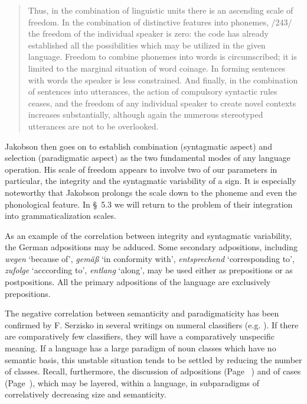 \begin{quote}
Thus, in the combination of linguistic units there is an ascending scale of freedom. In the combination of distinctive features into phonemes, /243/ the freedom of the individual speaker is zero: the code has already established all the possibilities which may be utilized in the given language. Freedom to combine phonemes into words is circumscribed; it is limited to the marginal situation of word coinage. In forming sentences with words the speaker is less constrained. And finally, in the combination of sentences into utterances, the action of compulsory syntactic rules ceases, and the freedom of any individual speaker to create novel contexts increases substantially, although again the numerous stereotyped utterances are not to be overlooked.
\end{quote}

\noindent Jakobson then goes on to establish combination (syntagmatic aspect) and selection (paradigmatic aspect) as the two fundamental modes of any language operation. His scale of freedom appears to involve two of our parameters in particular, the integrity and the syntagmatic variability of a sign. It is especially noteworthy that Jakobson prolongs the scale down to the phoneme and even the phonological feature. In §~5.3 we will return to the problem of their integration into grammaticalization scales.

As an example of the correlation between integrity and syntagmatic variability, the German adpositions may be adduced. Some secondary adpositions, including \textit{wegen} ‘because of’, \textit{gemäß} ‘in conformity with’, \textit{entsprechend} ‘corresponding to’, \textit{zufolge} ‘acccording to’, \textit{entlang} ‘along’, may be used either as prepositions or as postpositions. All the primary adpositions of the language are exclusively prepositions.

The negative correlation between semanticity and paradigmaticity has been confirmed by F. Serzisko in several writings on numeral classifiers (e.g. \citeyear[23f]{Serzisko1980}). If there are comparatively few classifiers, they will have a comparatively unspecific meaning. If a language has a large paradigm of noun classes which have no semantic basis, this unstable situation tends to be settled by reducing the number of classes. Recall, furthermore, the discussion of adpositions (Page~\pageref{page102}\chk%
) and of cases (Page~\pageref{page120}), which may be layered, within a language, in subparadigms of correlatively decreasing size and semanticity.

